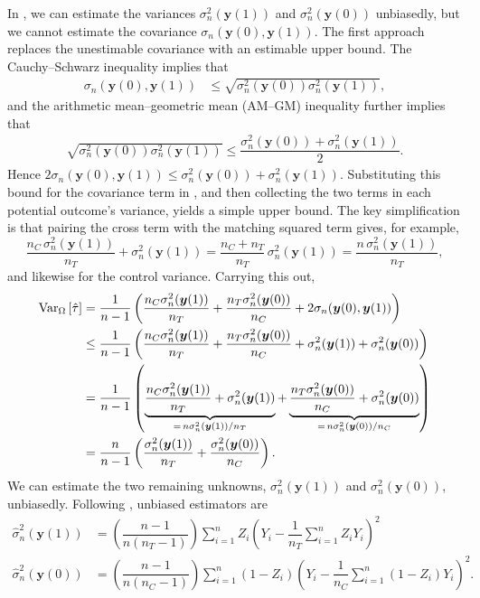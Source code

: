 \documentclass[12pt,leqno]{article}
\theoremstyle{newstyle}
\newcommand{\pov}[1]{\bm{y}(#1)}    %
\newcommand{\tauhat}{\hat{\tau}}
\newcommand{\ssq}[2][n]{\sigma_{#1}^{2}(#2)}
\newcommand{\scov}[2][n]{\sigma_{#1}(#2)}
\newcommand{\ssqhat}[2][n]{\widehat{\sigma}_{#1}^{2}(#2)}
\begin{document}
In , we can estimate the variances $\ssq{\pov{1}}$ and $\ssq{\pov{0}}$ unbiasedly, but we cannot estimate the covariance $\scov{\pov{0}, \pov{1}}$. The first approach replaces the unestimable covariance with an estimable upper bound. The Cauchy--Schwarz inequality implies that
\begin{align*}
\scov{\pov{0}, \pov{1}} & \leq \sqrt{\ssq{\pov{0}} \ssq{\pov{1}}},
\end{align*}
and the arithmetic mean--geometric mean (AM--GM) inequality further implies that
\begin{align*}
\sqrt{\ssq{\pov{0}} \ssq{\pov{1}}} \leq \dfrac{\ssq{\pov{0}} + \ssq{\pov{1}}}{2}.
\end{align*}
Hence $2\scov{\pov{0}, \pov{1}} \leq  \ssq{\pov{0}} +  \ssq{\pov{1}}$. Substituting this bound for the covariance term in , and then collecting the two terms in each potential outcome's variance, yields a simple upper bound. The key simplification is that pairing the cross term with the matching squared term gives, for example,
\begin{equation*}
\dfrac{n_C \, \ssq{\pov{1}}}{n_T} + \ssq{\pov{1}} = \dfrac{n_C + n_T}{n_T}\,\ssq{\pov{1}} = \dfrac{n \, \ssq{\pov{1}}}{n_T},
\end{equation*}
and likewise for the control variance. Carrying this out,
\small
\begin{align*}
\VarZ\left[\tauhat\right] & = \dfrac{1}{n - 1}\left(\dfrac{n_C \ssq{\pov{1}}}{n_T} + \dfrac{n_T \ssq{\pov{0}}}{n_C} + 2\scov{\pov{0}, \pov{1}}\right) \\
& \leq \dfrac{1}{n - 1}\left(\dfrac{n_C \ssq{\pov{1}}}{n_T} + \dfrac{n_T \ssq{\pov{0}}}{n_C} + \ssq{\pov{1}} + \ssq{\pov{0}}\right) \\
& = \dfrac{1}{n - 1}\left(\underbrace{\dfrac{n_C \ssq{\pov{1}}}{n_T} + \ssq{\pov{1}}}_{= \, n \ssq{\pov{1}}/n_T} + \underbrace{\dfrac{n_T \ssq{\pov{0}}}{n_C} + \ssq{\pov{0}}}_{= \, n \ssq{\pov{0}}/n_C}\right) \\
& = \dfrac{n}{n - 1}\left(\dfrac{\ssq{\pov{1}}}{n_T} + \dfrac{\ssq{\pov{0}}}{n_C}\right).
\end{align*}
\normalsize
We can estimate the two remaining unknowns, $\ssq{\pov{1}}$ and $\ssq{\pov{0}}$, unbiasedly. Following \citet[][Theorem 2.4]{cochran1977}, unbiased estimators are
\small
\begin{align*}
\ssqhat{\pov{1}} & = \left(\dfrac{n - 1}{n\left(n_T - 1\right)}\right)\sum \limits_{i = 1}^n Z_i \left(Y_i - \dfrac{1}{n_T} \sum \limits_{i = 1}^n Z_i Y_i \right)^2 \\
\ssqhat{\pov{0}} & = \left(\dfrac{n - 1}{n\left(n_C - 1\right)}\right)\sum \limits_{i = 1}^n (1 - Z_i) \left(Y_i - \dfrac{1}{n_C} \sum \limits_{i = 1}^n (1 - Z_i) Y_i\right)^2.
\end{align*}
\end{document}

